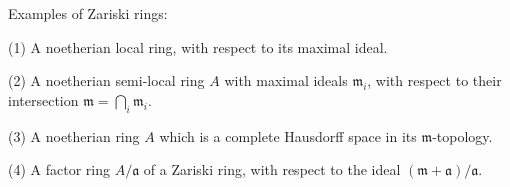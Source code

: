 Examples of Zariski rings:

(1) A noetherian local ring, with respect to its maximal ideal.

(2) A noetherian semi-local ring $A$ with maximal ideals $\mathfrak{m}_i$, with respect to their intersection $\mathfrak{m} = \bigcap_i \mathfrak{m}_i$.

(3) A noetherian ring $A$ which is a complete Hausdorff space in its $\mathfrak{m}$-topology.

(4) A factor ring $A/\mathfrak{a}$ of a Zariski ring, with respect to the ideal $(\mathfrak{m} + \mathfrak{a})/\mathfrak{a}$.